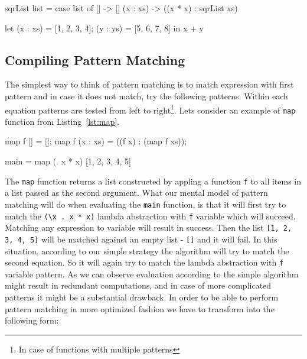 \documentclass[12pt,a4paper]{report}
\begin{document}
\vspace*{0.2in}
\begin{code}[style=haskell,label=lst:case_pattern_matching,caption={Pattern matching in
case expressions.}]
sqrList list =
    case list of
        [] -> []
        (x : xs) -> ((x * x) : sqrList xs)
\end{code}

\vspace*{0.2in}
\begin{code}[style=haskell,label=lst:letrec_pattern_matching,caption={Pattern matching
  in let(rec) expressions.}]
let
    (x : xs) = [1, 2, 3, 4];
    (y : ys) = [5, 6, 7, 8]
in
    x + y
\end{code}

\subsection{Compiling Pattern Matching}
The simplest way to think of pattern matching is to match expression with first
pattern and in case it does not match, try the following patterns. Within each
equation patterns are tested from left to right\footnote{In case of functions
with multiple patterns}. Lets consider an example of \texttt{map} function from
Listing~\ref{lst:map}.

\vspace*{0.2in}
\begin{code}[style=haskell,label=lst:map,caption={Map function example.}]
map f [] = [];
map f (x : xs) = ((f x) : (map f xs));

main = map (\x . x * x) [1, 2, 3, 4, 5]
\end{code}

The \texttt{map} function returns a list constructed by appling a function
\texttt{f} to all items in a list passed as the second argument. What our
mental model of pattern matching will do when evaluating the \texttt{main}
function, is that it will first try to match the \texttt{(\textbackslash x . x
* x)} lambda abstraction with \texttt{f} variable which will succeed. Matching
any expression to variable will result in success. Then the list \texttt{[1, 2,
3, 4, 5]} will be matched against an empty list - \texttt{[]} and it will fail.
In this situation, according to our simple strategy the algorithm will try to
match the second equation. So it will again try to match the lambda abstraction
with \texttt{f} variable pattern. As we can observe evaluation according to the
simple algorithm might result in redundant computations, and in case of more
complicated patterns it might be a substantial drawback. In order to be able to
perform pattern matching in more optimized fashion we have to transform into
the following form:
\end{document}
